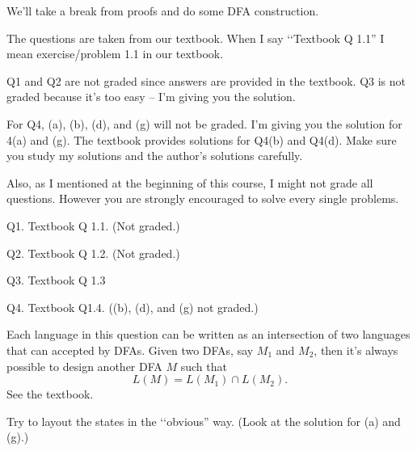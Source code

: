 


\renewcommand\TITLE{Assignment 5}
\renewcommand\AUTHOR{John Doe}
\renewcommand\EMAIL{jdoe1@jdoe1.com}


\topmatter

We'll take a break from proofs and do some
DFA construction.

The questions are taken from our textbook.
When I say \lq\lq Textbook Q 1.1'' 
I mean exercise/problem 1.1 in our textbook.

Q1 and Q2 are not graded since answers are provided in the textbook.
Q3 is not graded because it's too easy -- I'm giving you the solution.

For Q4, (a), (b), (d), and (g) will not be graded.
I'm giving you the solution for 4(a) and (g).
The textbook provides solutions for Q4(b) and Q4(d).
Make sure you study my solutions and the author's solutions carefully.

Also, as I mentioned at the beginning of this course, I might not grade
all questions.
However you are strongly encouraged to solve every 
single problems.




\newpage
Q1. Textbook Q 1.1. (Not graded.)

\SOLUTION





\newpage
Q2. Textbook Q 1.2. (Not graded.)

\SOLUTION




\newpage
Q3. Textbook Q 1.3

\SOLUTION




\newpage
Q4. Textbook Q1.4. ((b), (d), and (g) not graded.)

Each language in this question can be written as an intersection
of two languages that can accepted by DFAs.
Given two DFAs, say $M_1$ and $M_2$, 
then it's always possible to design another DFA $M$ such that
\[
L(M) = L(M_1) \cap L(M_2).
\]
See the textbook.

Try to layout the states in the \lq\lq obvious'' way.
(Look at the solution for (a) and (g).)

\SOLUTION


\newpage

\newpage

\newpage

\newpage

\newpage

\newpage

\newpage


